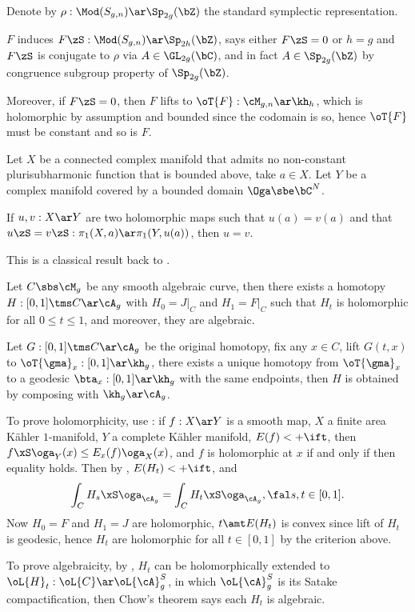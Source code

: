 \documentclass[a4paper, twoside]{article}
\begin{document}
\begin{prf}[Sketch]
	Denote by $\rho:\Mod(S_{g,n})\ar\Sp_{2g}(\bZ)$ the standard symplectic representation.

	$F$ induces $F\zS:\Mod(S_{g,n})\ar\Sp_{2h}(\bZ)$, \cite{Korkmaz2011} says either $F\zS=0$ or $h=g$ and $F\zS$ is conjugate to $\rho$ via $A\in\GL_{2g}(\bC)$, and in fact $A\in\Sp_{2g}(\bZ)$ by congruence subgroup property of $\Sp_{2g}(\bZ)$.

	Moreover, if $F\zS=0$, then $F$ lifts to $\oT{F}:\cM_{g,n}\ar\kh_{h}$, which is holomorphic by assumption and bounded since the codomain is so, hence $\oT{F}$ must be constant and so is $F$.
\end{prf}


\begin{thm}[Theorem~2.5]
	Let $X$ be a connected complex manifold that admits no non-constant plurisubharmonic function that is bounded above, take $a\in X$. Let $Y$ be a complex manifold covered by a bounded domain $\Oga\sbe\bC^{N}$.

	If $u,v:X\ar Y$ are two holomorphic maps such that $u(a)=v(a)$ and that $u\zS=v\zS:\pi_{1}(X,a)\ar\pi_{1}(Y,u(a))$, then $u=v$.
\end{thm}

\begin{rmk}
	This is a classical result back to \cite[Theorem~3.6]{BN1967}.
\end{rmk}


\begin{thm}
	Let $C\sbs\cM_{g}$ be any smooth algebraic curve, then there exists a homotopy $H:[0,1]\tms C\ar \cA_{g}$ with $H_{0}=J|_{C}$ and $H_{1}=F|_{C}$ such that $H_{t}$ is holomorphic for all $0\leq t\leq 1$, and moreover, they are algebraic.
\end{thm}

\begin{prf}[Sketch]
	 Let $G:[0,1]\tms C\ar\cA_{g}$ be the original homotopy, fix any $x\in C$, lift $G(t,x)$ to $\oT{\gma}_{x}:[0,1]\ar\kh_{g}$, there exists a unique homotopy from $\oT{\gma}_{x}$ to a geodesic $\bta_{x}:[0,1]\ar\kh_{g}$ with the same endpoints, then $H$ is obtained by composing with $\kh_{g}\ar\cA_{g}$.

	 To prove holomorphicity, use \cite{ES1964}: if $f:X\ar Y$ is a smooth map, $X$ a finite area K{\"a}hler $1$-manifold, $Y$ a complete K{\"a}hler manifold, $E(f)<+\ift$, then $f\xS\oga_{Y}(x)\leq E_{x}(f)\oga_{X}(x)$, and $f$ is holomorphic at $x$ if and only if then equality holds. Then by \cite{AAS2018}, $E(H_{t})<+\ift$, and
	\[
		\int_{C}H_{s}\xS\oga_{\cA_{g}}=\int_{C}H_{t}\xS\oga_{\cA_{g}}, \fal s,t\in[0,1].
	\]
	Now $H_{0}=F$ and $H_{1}=J$ are holomorphic, $t\amt E(H_{t})$ is convex since lift of $H_{t}$ is geodesic, hence $H_{t}$ are holomorphic for all $t\in[0,1]$ by the criterion above.

	 To prove algebraicity, by \cite{KO1971}, $H_{t}$ can be holomorphically extended to $\oL{H}_{t}:\oL{C}\ar\oL{\cA}_{g}^{S}$, in which $\oL{\cA}_{g}^{S}$ is its Satake compactification, then Chow's theorem says each $H_{t}$ is algebraic.
\end{prf}
\end{document}
